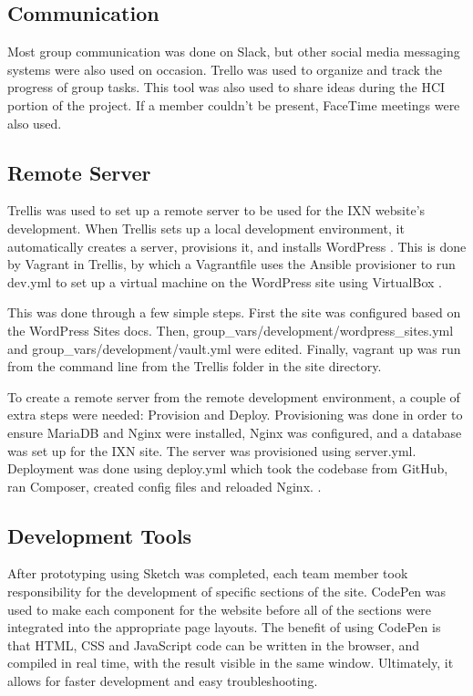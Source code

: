 \hypertarget{communication}{%
\subsection{Communication}\label{communication}}

Most group communication was done on Slack, but other social media
messaging systems were also used on occasion. Trello was used to
organize and track the progress of group tasks. This tool was also used
to share ideas during the HCI portion of the project. If a member
couldn't be present, FaceTime meetings were also used.

\hypertarget{remote-server}{%
\subsection{Remote Server}\label{remote-server}}

Trellis was used to set up a remote server to be used for the IXN
website's development. When Trellis sets up a local development
environment, it automatically creates a server, provisions it, and
installs WordPress \cite{p21} . This is done by Vagrant in Trellis, by
which a Vagrantfile uses the Ansible provisioner to run dev.yml to set
up a virtual machine on the WordPress site using VirtualBox \cite{p22} .

This was done through a few simple steps. First the site was configured
based on the WordPress Sites docs. Then,
group\_vars/development/wordpress\_sites.yml and
group\_vars/development/vault.yml were edited. Finally, vagrant up was
run from the command line from the Trellis folder in the site directory.

To create a remote server from the remote development environment, a
couple of extra steps were needed: Provision and Deploy. Provisioning
was done in order to ensure MariaDB and Nginx were installed, Nginx was
configured, and a database was set up for the IXN site. The server was
provisioned using server.yml. Deployment was done using deploy.yml which
took the codebase from GitHub, ran Composer, created config files and
reloaded Nginx. \cite{p23}.

\hypertarget{development-tools}{%
\subsection{Development Tools}\label{development-tools}}

After prototyping using Sketch was completed, each team member took
responsibility for the development of specific sections of the site.
CodePen was used to make each component for the website before all of
the sections were integrated into the appropriate page layouts. The
benefit of using CodePen is that HTML, CSS and JavaScript code can be
written in the browser, and compiled in real time, with the result
visible in the same window. \cite{p19} Ultimately, it allows for faster
development and easy troubleshooting.

